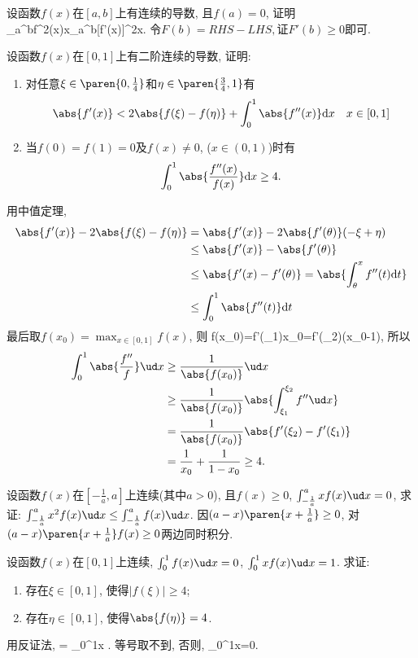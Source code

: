 \bq{}{}
设函数$f(x)$在$[a,b]$上有连续的导数, 且$f(a)=0$, 证明
\bee
\int_{a}^{b}f^{2}(x)x\le{}\int_{a}^{b}[f'(x)]^{2}x.
\eee
\eq
\ba
令$F(b)=RHS-LHS,$证$F'(b)\ge0$即可.
\ea

\bq{}{}
设函数$f(x)$在$[0,1]$上有二阶连续的导数, 证明:
\begin{enumerate}
\item 对任意$\xi\in\paren{0,\frac{1}{4}}$和$\eta\in\paren{\frac{3}{4},1}$有
\[
\abs{f'(x)}<2\abs{f(\xi)-f(\eta)}+\int_{0}^{1}\abs{f''(x)}\mathrm{d}x\quad x\in[0,1]
\]
\item 当$f(0)=f(1)=0$及$f(x)\ne0$, ($x\in(0,1)$)时有
\[
\int_{0}^{1}\abs{\frac{f''(x)}{f(x)}}\mathrm{d}x\ge4.
\]
\end{enumerate}
\eq
\ba
用中值定理, 
\begin{align*}
\abs{f'(x)}-2\abs{f(\xi)-f(\eta)} & =\abs{f'(x)}-2\abs{f'(\theta)}(-\xi+\eta)\\
 & \le\abs{f'(x)}-\abs{f'(\theta)}\\
 & \le\abs{f'(x)-f'(\theta)}=\abs{\int_{\theta}^{x}f''(t)\mathrm{d}t}\\
 & \le\int_{0}^{1}\abs{f''(t)}\mathrm{d}t
\end{align*}
最后取$f(x_{0})=\max_{x\in[0,1]}f(x)$, 则
\bee
f(x_0)=f'(\xi_1)x_0=f'(\xi_2)(x_0-1),
\eee
所以
\begin{align*}
\int_0^1\abs{\frac{f''}{f}}\ud x & \ge\frac1{\abs{f(x_0)}}\ud x\\
 & \ge \frac1{\abs{f(x_0)}}\abs{\int_{\xi_1}^{\xi_2}f''\ud x}\\
 & = \frac{1}{\abs{f(x_0)}}\abs{f'(\xi_2)-f'(\xi_1)}\\
 & = \frac1{x_0}+\frac1{1-x_0}\ge4.
\end{align*}
\ea

\bq{}{}
设函数$f(x)$在$\left[-\frac1a,a\right]$上连续(其中$a>0$), 且$f(x)\ge0$, $\int_{-\frac1a}^{a}xf(x)\ud x=0$, 求证: $\int_{-\frac1a}^ax^2f(x)\ud x\le\int_{-\frac1a}^af(x)\ud x$.
\eq
\ba
因$(a-x)\paren{x+\frac1a}\ge0$, 对$(a-x)\paren{x+\frac1a}f(x)\ge0$两边同时积分.
\ea

\bq{}{}
设函数$f(x)$在$[0,1]$上连续, $\int_0^1f(x)\ud x=0$, $\int_0^1xf(x)\ud x=1$. 求证: 
\begin{enumerate}[1.]
 \item 存在$\xi\in[0,1]$, 使得$|f(\xi)|\ge4$;
 \item 存在$\eta\in[0,1]$, 使得$\abs{f(\eta)}=4$.
\end{enumerate}
\eq
\ba
用反证法, 
=
  \le \int_0^1\cdot{}\ud x
  .
\eee
等号取不到, 否则, 
\bee
\int_0^1\ud x=0.
\eee
\ea

